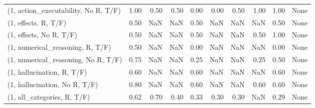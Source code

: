\begin{table*}[h!]
\begin{adjustbox}{width=2\columnwidth,center}
\begin{tabular}{lrrr|rrr|rrr}
(1, action\_executability, No R, T/F) &                      1.00 &                  0.50 &                      0.50 &                          0.00 &                      0.00 &                          0.50 &                                   1.00 &                               1.00 &                                  None \\
(1, effects, R, T/F)                 &                      0.50 &                   NaN &                       NaN &                          0.50 &                       NaN &                           NaN &                                    NaN &                               0.50 &                                  None \\
(1, effects, No R, T/F)              &                      0.50 &                   NaN &                       NaN &                          0.50 &                       NaN &                           NaN &                                   0.50 &                               1.00 &                                  None \\
(1, numerical\_reasoning, R, T/F)     &                      0.50 &                   NaN &                       NaN &                          0.00 &                       NaN &                           NaN &                                    NaN &                               0.00 &                                  None \\
(1, numerical\_reasoning, No R, T/F)  &                      0.75 &                   NaN &                       NaN &                          0.25 &                       NaN &                           NaN &                                   0.25 &                               0.50 &                                  None \\
(1, hallucination, R, T/F)           &                      0.60 &                   NaN &                       NaN &                          0.60 &                       NaN &                           NaN &                                    NaN &                               0.60 &                                  None \\
(1, hallucination, No R, T/F)        &                      0.80 &                   NaN &                       NaN &                          0.60 &                       NaN &                           NaN &                                   0.60 &                               0.60 &                                  None \\
(1, all\_categories, R, T/F)          &                      0.62 &                  0.70 &                      0.40 &                          0.33 &                      0.30 &                          0.30 &                                    NaN &                               0.29 &                                  None \\

\end{tabular}
\end{adjustbox}
\end{table*}
